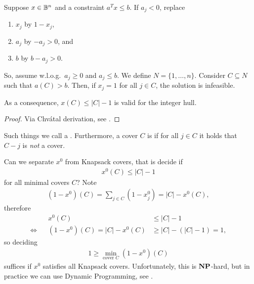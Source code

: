 Suppose $x \in \mathbb{B}^n$ and a constraint $a^Tx \leq b$.
If $a_j < 0$, replace
\begin{enumerate}
    \item $x_j$ by $1-x_j$,
    \item $a_j$ by $-a_j > 0$, and
    \item $b$ by $b-a_j > 0$.
\end{enumerate}
So, assume w.l.o.g.\ $a_j \geq 0$ and $a_j \leq b$. We define $N = \{1,\dots, n\}$.
Consider $C \subseteq N$ such that $a(C)>b$.
Then, if $x_j=1$ for all $j \in C$, the solution is infeasible.
\begin{theorem}
    As a consequence, $x(C) \leq |C|-1$ is valid for the integer hull.
\end{theorem}
\begin{proof}
    Via Chv\'atal derivation, see .
\end{proof}
\begin{definition}
    Such things we call a .
    Furthermore,  a cover $C$ is  if for all $j \in C$ it holds that $C-j$ is \emph{not} a cover.
\end{definition}
Can we separate $x^0$ from Knapsack covers, that is decide if
\begin{align*}
    x^0(C) \leq |C|-1
\end{align*}
for all minimal covers $C$?
Note
\begin{align*}
    (1-x^0)(C) = \sum_{j \in C}(1-x^0_j)= |C|-x^0(C),
\end{align*}
therefore
\begin{align*}
                    &  & x^0(C)                  & \leq |C|-1            \\
    \Leftrightarrow &  & (1-x^0)(C) = |C|-x^0(C) & \geq |C| - (|C|-1)=1,
\end{align*}
so deciding
\begin{align*}
    1 \geq \min_{\text{cover }C}(1-x^0)(C)
\end{align*}
suffices if $x^0$ satisfies all Knapsack covers.
Unfortunately, this is $\mathbf{NP}$-hard, but in practice we can use Dynamic Programming, see .

